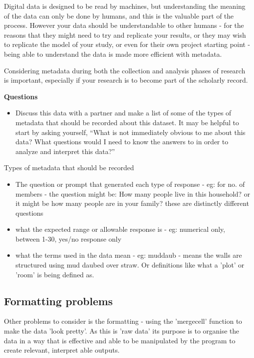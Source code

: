 \documentclass{article}
\begin{document}
Digital data is designed to be read by machines, but understanding the meaning of the data can only be done by humans, and this is the valuable part of the process. However your data should be understandable to other humans - for the reasons that they might need to try and replicate your results, or they may wish to replicate the model of your study, or even for their own project starting point - being able to understand the data is made more efficient with metadata. 

Considering metadata during both the collection and analysis phases of research is important, especially if your research is to become part of the scholarly record. 

\noindent \textbf{Questions}
\begin{itemize}
    \item Discuss this data with a partner and make a list of some of the types of metadata that should be recorded about this dataset. It may be helpful to start by asking yourself, ``What is not immediately obvious to me about this data? What questions would I need to know the answers to in order to analyze and interpret this data?''
\end{itemize}

Types of metadata that should be recorded
\begin{itemize}
    \item The question or prompt that generated each type of response - eg: for no. of members - the question might be: How many people live in this household? or it might be how many people are in your family? these are distinctly different questions
    \item what the expected range or allowable response is - eg: numerical only, between 1-30, yes/no response only
    \item what the terms used in the data mean - eg: muddaub - means the walls are structured using mud daubed over straw. Or definitions like what a 'plot' or 'room' is being defined as. 
\end{itemize}

\subsection{Formatting problems}

Other problems to consider is the formatting - using the 'mergecell' function to make the data 'look pretty'.
As this is 'raw data' its purpose is to organise the data in a way that is effective and able to be manipulated by the program to create relevant, interpret able outputs. 
\end{document}
